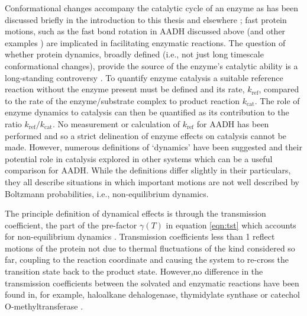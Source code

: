 Conformational changes accompany the catalytic cycle of an enzyme as has been discussed briefly in the introduction to this thesis and elsewhere \cite[chapter 10]{fershtStructureMechanismProtein1999}\cite{mcgeaghProteinDynamicsEnzyme2011, karplusMolecularDynamicsProtein2005}; fast protein motions, such as the fast bond rotation in AADH discussed above (and other examples \cite{hayGoodVibrationsEnzymecatalysed2012, klinmanHydrogenTunnelingLinks2013}) are implicated in facilitating enzymatic reactions.  The question of whether protein dynamics, broadly defined (i.e., not just long timescale conformational changes), provide the source of the enzyme's catalytic ability is a long-standing controversy \cite{kamerlinDawn21stCentury2010a, doshiDilemmaConformationalDynamics2014, kohenRoleDynamicsEnzyme2015,warshelPerspectiveDefiningQuantifying2016, mcgeaghProteinDynamicsEnzyme2011}. To quantify enzyme catalysis a suitable reference reaction without the enzyme present must be defined and its rate, $k_{\mathrm{ref}}$, compared to the rate of the enzyme/substrate complex to product reaction $k_{\mathrm{cat}}$. The role of enzyme dynamics to catalysis can then be quantified as its contribution to the ratio $k_{\mathrm{ref}}/k_{\mathrm{cat}}$.  No measurement or calculation of $k_{\mathrm{ref}}$ for AADH has been performed and so a strict delineation of enzyme effects on catalysis cannot be made. However, numerous definitions of `dynamics' have been suggested and their potential role in catalysis explored \cite{warshelPerspectiveDefiningQuantifying2016} in other systems which can be a useful comparison for AADH. While the definitions differ slightly in their particulars, they all describe situations in which important motions are not well described by Boltzmann probabilities, i.e., non-equilibrium dynamics. 

The principle definition of dynamical effects is through the transmission coefficient, the part of the pre-factor $\gamma(T)$ in equation \ref{eqn:tst} which accounts for non-equilibrium dynamics \cite{kamerlinDawn21stCentury2010a,warshelPerspectiveDefiningQuantifying2016}. Transmission coefficients less than \num{1} reflect motions of the protein not due to thermal fluctuations of the kind considered so far, coupling to the reaction coordinate and causing the system to re-cross the transition state back to the product state. However,no difference in the transmission coefficients between the solvated and enzymatic reactions have been found in, for example, haloalkane dehalogenase\cite{olssonSoluteSolventDynamics2004}, thymidylate synthase \cite{kanaanTheoreticalStudyTemperature2010} or catechol O-methyltransferase \cite{rocaCouplingProteinReaction2006}.

